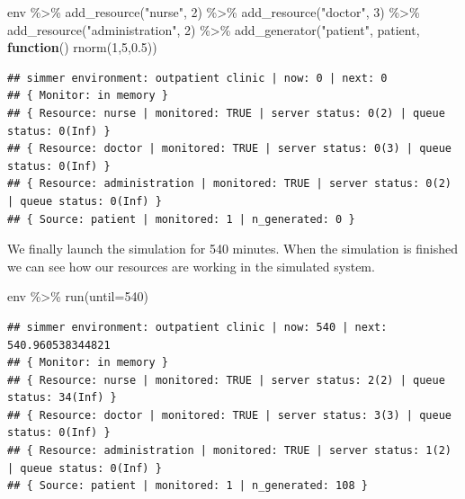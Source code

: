 \documentclass[
]{book}
\newenvironment{Shaded}{\begin{snugshade}}{\end{snugshade}}
\newcommand{\AttributeTok}[1]{\textcolor[rgb]{0.77,0.63,0.00}{#1}}
\newcommand{\ControlFlowTok}[1]{\textcolor[rgb]{0.13,0.29,0.53}{\textbf{#1}}}
\newcommand{\DecValTok}[1]{\textcolor[rgb]{0.00,0.00,0.81}{#1}}
\newcommand{\FloatTok}[1]{\textcolor[rgb]{0.00,0.00,0.81}{#1}}
\newcommand{\FunctionTok}[1]{\textcolor[rgb]{0.00,0.00,0.00}{#1}}
\newcommand{\NormalTok}[1]{#1}
\newcommand{\SpecialCharTok}[1]{\textcolor[rgb]{0.00,0.00,0.00}{#1}}
\newcommand{\StringTok}[1]{\textcolor[rgb]{0.31,0.60,0.02}{#1}}
\theoremstyle{definition}
\theoremstyle{definition}
\theoremstyle{definition}
\theoremstyle{definition}
\theoremstyle{remark}
\begin{document}
\begin{Shaded}
\begin{Highlighting}[]
\NormalTok{env }\SpecialCharTok{\%\textgreater{}\%}
  \FunctionTok{add\_resource}\NormalTok{(}\StringTok{"nurse"}\NormalTok{, }\DecValTok{2}\NormalTok{) }\SpecialCharTok{\%\textgreater{}\%}
  \FunctionTok{add\_resource}\NormalTok{(}\StringTok{"doctor"}\NormalTok{, }\DecValTok{3}\NormalTok{) }\SpecialCharTok{\%\textgreater{}\%}
  \FunctionTok{add\_resource}\NormalTok{(}\StringTok{"administration"}\NormalTok{, }\DecValTok{2}\NormalTok{) }\SpecialCharTok{\%\textgreater{}\%}
  \FunctionTok{add\_generator}\NormalTok{(}\StringTok{"patient"}\NormalTok{, patient, }\ControlFlowTok{function}\NormalTok{() }\FunctionTok{rnorm}\NormalTok{(}\DecValTok{1}\NormalTok{,}\DecValTok{5}\NormalTok{,}\FloatTok{0.5}\NormalTok{))}
\end{Highlighting}
\end{Shaded}

\begin{verbatim}
## simmer environment: outpatient clinic | now: 0 | next: 0
## { Monitor: in memory }
## { Resource: nurse | monitored: TRUE | server status: 0(2) | queue status: 0(Inf) }
## { Resource: doctor | monitored: TRUE | server status: 0(3) | queue status: 0(Inf) }
## { Resource: administration | monitored: TRUE | server status: 0(2) | queue status: 0(Inf) }
## { Source: patient | monitored: 1 | n_generated: 0 }
\end{verbatim}

We finally launch the simulation for 540 minutes. When the simulation is finished we can see how our resources are working in the simulated system.

\begin{Shaded}
\begin{Highlighting}[]
\NormalTok{env }\SpecialCharTok{\%\textgreater{}\%}
  \FunctionTok{run}\NormalTok{(}\AttributeTok{until=}\DecValTok{540}\NormalTok{)}
\end{Highlighting}
\end{Shaded}

\begin{verbatim}
## simmer environment: outpatient clinic | now: 540 | next: 540.960538344821
## { Monitor: in memory }
## { Resource: nurse | monitored: TRUE | server status: 2(2) | queue status: 34(Inf) }
## { Resource: doctor | monitored: TRUE | server status: 3(3) | queue status: 0(Inf) }
## { Resource: administration | monitored: TRUE | server status: 1(2) | queue status: 0(Inf) }
## { Source: patient | monitored: 1 | n_generated: 108 }
\end{verbatim}
\end{document}

